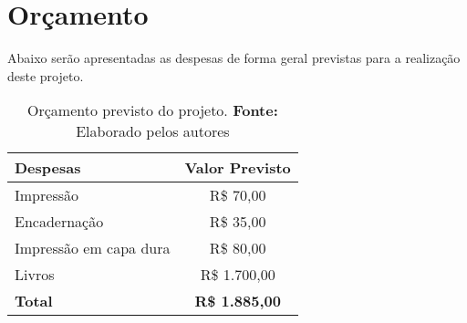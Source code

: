\newpage
\section{Orçamento}

\par Abaixo serão apresentadas as despesas de forma geral previstas para a realização deste projeto.

\begin{table}[h]
	\begin{center}
  		\begin{tabular}{|l|c|}
  			\hline
  			\textbf{Despesas} & 
  			\textbf{Valor Previsto} \\
  			\hline
  			Impressão 				& R\$ 70,00 \\ \hline
  			Encadernação 			& R\$ 35,00 \\ \hline
  			Impressão em capa dura	& R\$ 80,00 \\ \hline
  			Livros 					& R\$ 1.700,00 \\ \hline
  			\textbf{Total}			& 
  			\textbf{R\$ 1.885,00} \\ \hline
  		\end{tabular}
  	\end{center}
  	\caption{Orçamento previsto do projeto. \textbf{Fonte:} Elaborado pelos autores}
\end{table}
